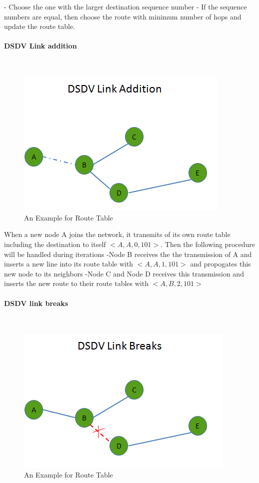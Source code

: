 \documentclass[twoside]{article}
\begin{document}
	- Choose the one with the larger destination sequence number
	- If the sequence numbers are equal, then choose the route with minimum number of hops and update the route table.
	
		\paragraph{DSDV Link addition}\hspace{0pt} \\
			\begin{figure}[H]
				\caption{An Example for Route Table}
				\centering
				\includegraphics[scale = 0.65]{link_add}
			\end{figure}
	
	When a new node A joins the network, it transmits of its own route table including the destination to itself $<A,A,0,101>$. Then the following procedure will be handled during iterations
	-Node B receives the the transmission of A and inserts a new line into its route table with $<A,A,1,101>$ and propogates this new node to its neighbors
	-Node C and Node D receives this transmission and inserts the new route to their route tables with $<A,B,2,101>$
	
	
	\paragraph{DSDV link breaks}\hspace{0pt} \\
	
			\begin{figure}[H]
				\caption{An Example for Route Table}
				\centering
				\includegraphics[scale = 0.65]{link_break}
			\end{figure}
\end{document}
